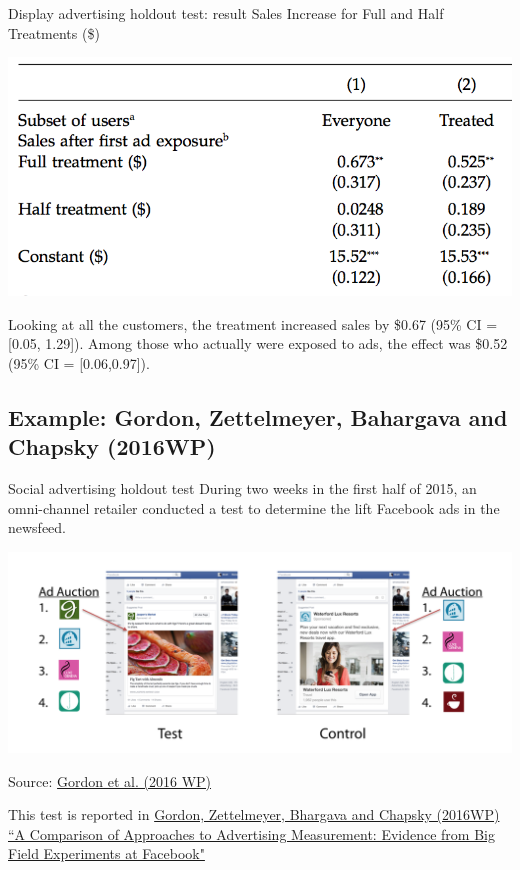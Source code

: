 \documentclass[10pt, aspectratio=169]{beamer}
\newcommand{\source}[1]{\begin{flushright} \footnotesize Source: {#1} \end{flushright} \normalsize}
\begin{document}
\begin{frame}{Display advertising holdout test: result}
Sales Increase for Full and Half Treatments (\$)
\begin{center}
\includegraphics[height=0.5\textheight]{images/johnsonetalresult.png}
\end{center}
\alert{Looking at all the customers, the treatment increased sales by \$0.67 (95\% CI = [0.05, 1.29]). Among those who actually were exposed to ads, the effect was \$0.52 (95\% CI = [0.06,0.97]).}
\end{frame}

\subsection{Example: Gordon, Zettelmeyer, Bahargava and Chapsky (2016WP)}

\begin{frame}{Social advertising holdout test}
During two weeks in the first half of 2015, an omni-channel retailer conducted a test to determine the lift Facebook ads in the newsfeed. 
\begin{center}
\includegraphics[height=0.5\textheight]{images/gordonetaltreatmentcontrol2.png}\\
\source{\href{https://github.com/eleafeit/ad_response_tutorial/blob/master/Papers/Gordonetal2016WPFieldExperimentsatFacebook.pdf}{Gordon et al. (2016 WP)}}
\end{center}
This test is reported in \href{https://github.com/eleafeit/ad_response_tutorial/blob/master/Papers/Gordonetal2016WPFieldExperimentsatFacebook.pdf}{Gordon, Zettelmeyer, Bhargava and Chapsky (2016WP) ``A Comparison of Approaches to Advertising Measurement: Evidence from Big Field Experiments at Facebook"}
\end{frame}
\end{document}
